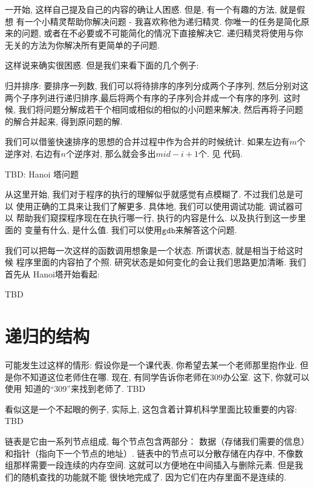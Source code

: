 一开始, 这样自己提及自己的内容的确让人困惑. 但是, 有一个有趣的方法, 就是假想
有一个小精灵帮助你解决问题 - 我喜欢称他为递归精灵. 
你唯一的任务是简化原来的问题, 或者在不必要或不可能简化的情况下直接解决它. 
递归精灵将使用与你无关的方法为你解决所有更简单的子问题. 

这样说来确实很困惑. 但是我们来看下面的几个例子: 

\begin{example}
    归并排序: 要排序一列数, 我们可以将待排序的序列分成两个子序列,
    然后分别对这两个子序列进行递归排序,最后将两个有序的子序列合并成一个有序的序列.
    这时候, 我们将问题分解成若干个相同或相似的相似的小问题来解决, 
    然后再将子问题的解合并起来, 得到原问题的解. 
\end{example}

 我们可以借鉴快速排序的思想的合并过程中作为合并的时候统计. 
如果左边有$m$个逆序对, 右边有$n$个逆序对, 那么就会多出$mid-i+1$个. 见
代码. 

\begin{example}
    TBD: Hanoi 塔问题
\end{example}


从这里开始, 我们对于程序的执行的理解似乎就感觉有点模糊了. 不过我们总是可以
使用正确的工具来让我们了解更多. 具体地, 我们可以使用调试功能. 调试器可以
帮助我们窥探程序现在在执行哪一行, 执行的内容是什么. 以及执行到这一步里面的
变量有什么, 是什么值. 我们可以使用$\texttt{gdb}$来解答这个问题. 

我们可以把每一次这样的函数调用想象是一个状态. 所谓状态, 就是相当于给这时候
程序里面的内容拍了个照. 研究状态是如何变化的会让我们思路更加清晰. 我们首先从
Hanoi塔开始看起: 

TBD

\section{递归的结构}

 可能发生过这样的情形: 假设你是一个课代表, 你希望去某一个老师那里抱作业. 
但是你不知道这位老师住在哪. 现在, 有同学告诉你老师在309办公室. 这下, 你就可以使用
知道的``309''来找到老师了. TBD

看似这是一个不起眼的例子, 实际上, 这包含着计算机科学里面比较重要的内容: TBD

 链表是它由一系列节点组成, 每个节点包含两部分：
数据（存储我们需要的信息）和指针（指向下一个节点的地址）. 
链表中的节点可以分散存储在内存中, 不像数组那样需要一段连续的内存空间. 
这就可以方便地在中间插入与删除元素. 但是我们的随机查找的功能就不能
很快地完成了. 因为它们在内存里面不是连续的. 

